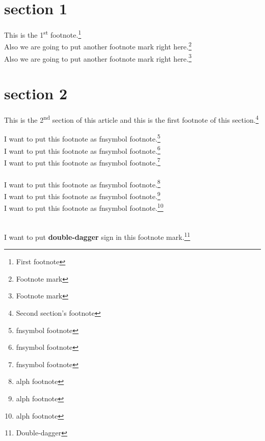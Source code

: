 \documentclass[12pt, a4paper, onecolumn]{article}
\begin{document}
	
	
	\setcounter{footnote}{0} %
	\section*{section 1}
		\noindent
		This is the 1\textsuperscript{st} footnote.\footnote{First footnote}\\
		Also we are going to put another footnote mark right here.\footnote{Footnote mark}\\
		Also we are going to put another footnote mark right here.\footnote{Footnote mark}
		
	\setcounter{footnote}{0}
	\section*{section 2}
		This is the 2\textsuperscript{nd} section of this article and this is the first footnote of this section.\footnote{Second section's footnote}
		
	\newpage
	
	\setcounter{footnote}{0}
	\renewcommand{\thefootnote}{\fnsymbol{footnote}}
	\noindent
	I want to put this footnote as fnsymbol footnote.\footnote{fnsymbol footnote}\\
	I want to put this footnote as fnsymbol footnote.\footnote{fnsymbol footnote}\\
	I want to put this footnote as fnsymbol footnote.\footnote{fnsymbol footnote}\\
	\\
	
	\renewcommand{\thefootnote}{\alph{footnote}}
	\noindent
	I want to put this footnote as fnsymbol footnote.\footnote{alph footnote}\\
	I want to put this footnote as fnsymbol footnote.\footnote{alph footnote}\\
	I want to put this footnote as fnsymbol footnote.\footnote{alph footnote}\\
	\\
	
	
	\renewcommand{\thefootnote}{\fnsymbol{footnote}}
	
	\noindent
	I want to put \textbf{double-dagger} sign in this footnote mark.\footnote[3]{Double-dagger}
	
	
\end{document}
